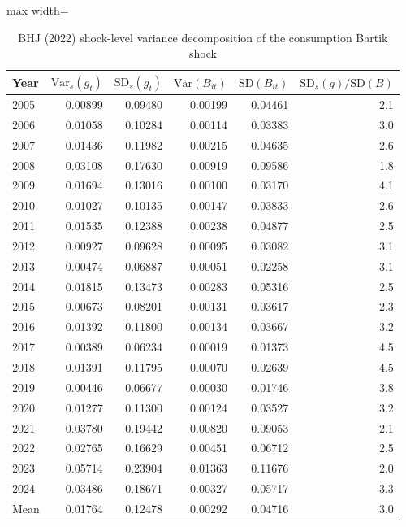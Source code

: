 
\begin{table}[htbp]
\centering
\caption{BHJ (2022) shock-level variance decomposition of the consumption Bartik shock}
\label{tab:bhj-variance}
\begin{adjustbox}{max width=\textwidth}
\begin{threeparttable}\small
\begin{tabular}{l rrrrr}
\toprule
Year & $\text{Var}_s(g_t)$ & $\text{SD}_s(g_t)$ & $\text{Var}(B_{it})$ & $\text{SD}(B_{it})$ & $\text{SD}_s(g)/\text{SD}(B)$ \\
\midrule
2005 & 0.00899 & 0.09480 & 0.00199 & 0.04461 & 2.1 \\
2006 & 0.01058 & 0.10284 & 0.00114 & 0.03383 & 3.0 \\
2007 & 0.01436 & 0.11982 & 0.00215 & 0.04635 & 2.6 \\
2008 & 0.03108 & 0.17630 & 0.00919 & 0.09586 & 1.8 \\
2009 & 0.01694 & 0.13016 & 0.00100 & 0.03170 & 4.1 \\
2010 & 0.01027 & 0.10135 & 0.00147 & 0.03833 & 2.6 \\
2011 & 0.01535 & 0.12388 & 0.00238 & 0.04877 & 2.5 \\
2012 & 0.00927 & 0.09628 & 0.00095 & 0.03082 & 3.1 \\
2013 & 0.00474 & 0.06887 & 0.00051 & 0.02258 & 3.1 \\
2014 & 0.01815 & 0.13473 & 0.00283 & 0.05316 & 2.5 \\
2015 & 0.00673 & 0.08201 & 0.00131 & 0.03617 & 2.3 \\
2016 & 0.01392 & 0.11800 & 0.00134 & 0.03667 & 3.2 \\
2017 & 0.00389 & 0.06234 & 0.00019 & 0.01373 & 4.5 \\
2018 & 0.01391 & 0.11795 & 0.00070 & 0.02639 & 4.5 \\
2019 & 0.00446 & 0.06677 & 0.00030 & 0.01746 & 3.8 \\
2020 & 0.01277 & 0.11300 & 0.00124 & 0.03527 & 3.2 \\
2021 & 0.03780 & 0.19442 & 0.00820 & 0.09053 & 2.1 \\
2022 & 0.02765 & 0.16629 & 0.00451 & 0.06712 & 2.5 \\
2023 & 0.05714 & 0.23904 & 0.01363 & 0.11676 & 2.0 \\
2024 & 0.03486 & 0.18671 & 0.00327 & 0.05717 & 3.3 \\
\midrule
Mean & 0.01764 & 0.12478 & 0.00292 & 0.04716 & 3.0 \\

\end{tabular}
\end{threeparttable}
\end{adjustbox}
\end{table}

